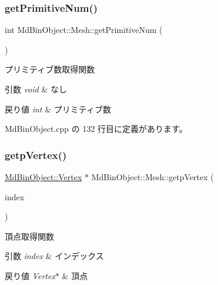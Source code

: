 \subsubsection{\texorpdfstring{get\+Primitive\+Num()}{getPrimitiveNum()}}
{\footnotesize\ttfamily int Md\+Bin\+Object\+::\+Mesh\+::get\+Primitive\+Num (\begin{DoxyParamCaption}{ }\end{DoxyParamCaption})}



プリミティブ数取得関数 


\begin{DoxyParams}{引数}
{\em void} & なし \\
\hline
\end{DoxyParams}

\begin{DoxyRetVals}{戻り値}
{\em int} & プリミティブ数 \\
\hline
\end{DoxyRetVals}


 Md\+Bin\+Object.\+cpp の 132 行目に定義があります。

\mbox{\label{class_md_bin_object_1_1_mesh_a5f4f7ae157b3cd20ae2b4039ccf3d613}} 
\subsubsection{\texorpdfstring{getp\+Vertex()}{getpVertex()}}
{\footnotesize\ttfamily \mbox{\hyperlink{struct_md_bin_object_1_1_vertex}{Md\+Bin\+Object\+::\+Vertex}} $\ast$ Md\+Bin\+Object\+::\+Mesh\+::getp\+Vertex (\begin{DoxyParamCaption}\item[{int}]{index }\end{DoxyParamCaption})}



頂点取得関数 


\begin{DoxyParams}{引数}
{\em index} & インデックス \\
\hline
\end{DoxyParams}

\begin{DoxyRetVals}{戻り値}
{\em Vertex$\ast$} & 頂点 \\
\hline
\end{DoxyRetVals}



